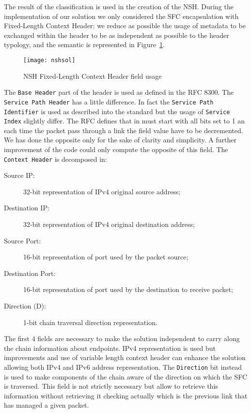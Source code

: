 The result of the classification is used in the creation of the NSH. During the
implementation of our solution we only considered the SFC encapsulation with
Fixed-Length Context Header: we reduce as possible the usage of metadata to be
exchanged within the header to be as independent as possible to the header
typology, and the semantic is represented in Figure~\ref{chap:impl:img:nsh}.

\begin{figure}
  \centering \texttt{[image: nshsol]}
  \caption{NSH Fixed-Length Context Header field usage}
  \label{chap:impl:img:nsh}
\end{figure}

The \texttt{Base Header} part of the header is used as defined in the RFC 8300.
The \texttt{Service Path Header} has a little difference. In fact the 
\texttt{Service Path Identifier} is used as described into the standard but the
usage of \texttt{Service Index} slightly differ. The RFC defines that in must
start with all bits set to 1 an each time the packet pass through a link the
field value have to be decremented. We has done the opposite only for the sake
of clarity and simplicity. A further improvement of the code could only compute
the opposite of this field. The \texttt{Context Header} is decomposed in:
\begin{description}
  \item[Source IP:] 32-bit representation of IPv4 original source address;
  \item[Destination IP:] 32-bit representation of IPv4 original destination
  address;
  \item[Source Port:] 16-bit representation of port used by the packet source;
  \item[Destination Port:] 16-bit representation of port used by the destination
  to receive packet;
  \item[Direction (D):] 1-bit chain traversal direction representation.
\end{description}
The first 4 fields are necessary to make the solution independent to carry along
the chain information about endpoints. IPv4 representation is used but
improvements and use of variable length context header can enhance the
solution allowing both IPv4 and IPv6 address representation. The 
\texttt{Direction} bit instead is used to make components of the chain aware of
the direction on which the SFC is traversed. This field is not strictly
necessary but allow to retrieve this information without retrieving it checking
actually which is the previous link that has managed a given packet. 

